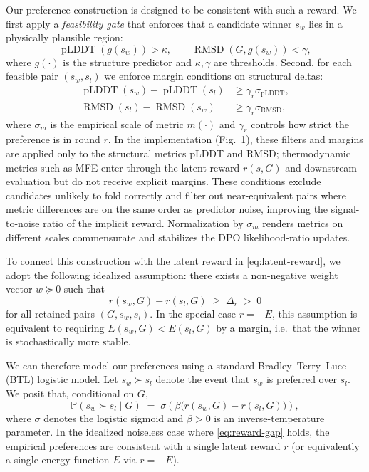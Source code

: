 {{Our preference construction is designed to be consistent with such a reward.
We first apply a \emph{feasibility gate} that enforces that a candidate
winner $s_w$ lies in a physically plausible region:
\begin{equation}
    \operatorname{pLDDT}(g(s_w)) > \kappa, \qquad
    \operatorname{RMSD}(G, g(s_w)) < \gamma,
    \label{eq:gate}
\end{equation}
where $g(\cdot)$ is the structure predictor and
$\kappa, \gamma$ are thresholds.
Second, for each feasible pair $(s_w, s_l)$ we enforce margin
conditions on structural deltas:
\begin{align}
    \operatorname{pLDDT}(s_w) - \operatorname{pLDDT}(s_l)
    &\ge \gamma_r \sigma_{\text{pLDDT}},
    \label{eq:margin-plddt}
    \\
    \operatorname{RMSD}(s_l) - \operatorname{RMSD}(s_w)
    &\ge \gamma_r \sigma_{\text{RMSD}},
    \label{eq:margin-rmsd}
\end{align}
where $\sigma_m$ is the empirical scale of metric $m(\cdot)$ and
$\gamma_r$ controls how strict the preference is in round $r$.
In the implementation (Fig.~1), these filters and margins are applied only
to the structural metrics pLDDT and RMSD; thermodynamic metrics such as MFE
enter through the latent reward $r(s,G)$ and downstream evaluation but do
not receive explicit margins.
These conditions exclude candidates unlikely to fold correctly and filter out
near-equivalent pairs where metric differences are on the same order as
predictor noise, improving the signal-to-noise ratio of the implicit reward.
Normalization by $\sigma_m$ renders metrics on different scales commensurate
and stabilizes the DPO likelihood-ratio updates.

To connect this construction with the latent reward in
\eqref{eq:latent-reward}, we adopt the following idealized assumption:
there exists a non-negative weight vector
$w \succeq 0$ such that
\begin{equation}
    r(s_w, G) - r(s_l, G) \;\geq\; \Delta_r \;>\; 0
    \label{eq:reward-gap}
\end{equation}
for all retained pairs $(G, s_w, s_l)$.
In the special case $r=-E$, this assumption is equivalent to requiring
$E(s_w,G) < E(s_l,G)$ by a margin, i.e.\ that the winner is stochastically
more stable.

We can therefore model our preferences using a standard
Bradley--Terry--Luce (BTL) logistic model. Let
$s_w \succ s_l$ denote the event that $s_w$ is preferred over $s_l$.
We posit that, conditional on $G$,
\begin{equation}
    \mathbb{P}(s_w \succ s_l \mid G)
    \;=\;
    \sigma\!\left(
        \beta \bigl(
            r(s_w, G) - r(s_l, G)
        \bigr)
    \right),
    \label{eq:btl}
\end{equation}
where $\sigma$ denotes the logistic sigmoid and
$\beta > 0$ is an inverse-temperature parameter.
In the idealized noiseless case where \eqref{eq:reward-gap} holds,
the empirical preferences are consistent with a single latent reward $r$
(or equivalently a single energy function $E$ via $r=-E$).

}}
